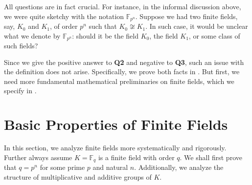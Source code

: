 \documentclass{template}
\begin{document}
All questions are in fact crucial. For instance, in the informal discussion
above, we were quite sketchy with the notation $\mathbb{F}_{p^n}$. Suppose we
had two finite fields, say, $K_0$ and $K_1$, of order $p^n$ such that $K_0
\not\cong K_1$. In such case, it would be unclear what we denote by
$\mathbb{F}_{p^n}$: should it be the field $K_0$, the field $K_1$, or some class
of such fields?

Since we give the positive answer to \textbf{Q2} and negative to \textbf{Q3},
such an issue with the definition does not arise. Specifically, we prove both
facts in . But first, we need more fundamental
mathematical preliminaries on finite fields, which we specify in
.




\section{Basic Properties of Finite Fields}\label{section:basic-properties}

In this section, we analyze finite fields more systematically and rigorously.
Further always assume $K=\mathbb{F}_q$ is a finite field with order $q$. We
shall first prove that $q=p^n$ for some prime $p$ and natural $n$. Additionally,
we analyze the structure of multiplicative and additive groups of $K$.
\end{document}
